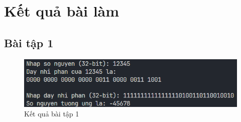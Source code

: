\documentclass[a4paper,12pt]{report}
\begin{document}
\pagebreak
\section{Kết quả bài làm}
\subsection{Bài tập 1}
\begin{figure}[!ht]
	\centering
	\includegraphics[width=0.9\linewidth]{imgs/1.png}
	\caption{Kết quả bài tập 1}
\end{figure}
\end{document}

